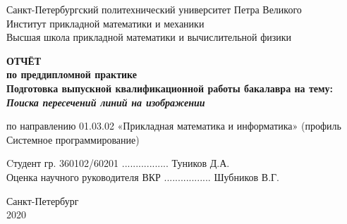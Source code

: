 \begin{titlepage}

\begin{center}
Санкт-Петербургский политехнический университет Петра Великого\\
Институт прикладной математики и механики\\
Высшая школа прикладной математики и вычислительной физики\\
\hrulefill
\end{center}

\vspace{5cm}

\begin{center}
{\large {\bfseries ОТЧЁТ\\
по преддипломной практике}}\\

\bigskip \bfseries{Подготовка выпускной квалификационной работы бакалавра на тему:} {\bfseries \emph{Поиска пересечений линий на изображении}}
\end{center}
\begin{center}
по направлению 01.03.02 «Прикладная математика и информатика» (профиль Системное программирование)
\end{center}


\vspace{2cm}
\begin{flushleft}
Cтудент гр. 360102/60201    \hfill{.................} \hfill{Туников Д.А.} \\
\vspace{0.5cm} 
Оценка научного руководителя ВКР \hfill{.................} \hfill{Шубников В.Г.}

\end{flushleft}

\vspace{3.5cm}

\begin{center}
Санкт-Петербург\\
2020
\end{center}

\end{titlepage}
